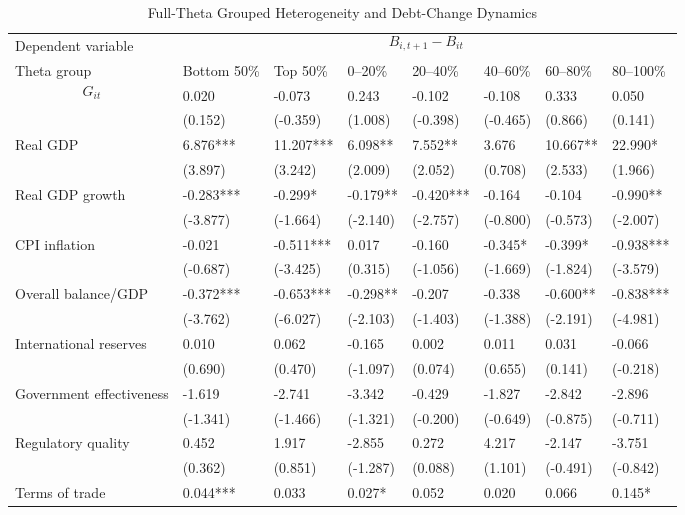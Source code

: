 \begin{table}[H]\centering
\begin{threeparttable}
\caption{Full-Theta Grouped Heterogeneity and Debt-Change Dynamics}
\label{tab:theta_group_heterogeneity_debt}
\scriptsize
\begin{tabularx}{\textwidth}{lYYYYYYY}
\toprule
Dependent variable &  \\
\cmidrule(lr){2-8}
Theta group & Bottom 50\% & Top 50\% & 0--20\% & 20--40\% & 40--60\% & 60--80\% & 80--100\% \\
\midrule
$$G_{it}$$ & 0.020 & -0.073 & 0.243 & -0.102 & -0.108 & 0.333 & 0.050 \\
  & (0.152) & (-0.359) & (1.008) & (-0.398) & (-0.465) & (0.866) & (0.141) \\
Real GDP & 6.876*** & 11.207*** & 6.098** & 7.552** & 3.676 & 10.667** & 22.990* \\
  & (3.897) & (3.242) & (2.009) & (2.052) & (0.708) & (2.533) & (1.966) \\
Real GDP growth & -0.283*** & -0.299* & -0.179** & -0.420*** & -0.164 & -0.104 & -0.990** \\
  & (-3.877) & (-1.664) & (-2.140) & (-2.757) & (-0.800) & (-0.573) & (-2.007) \\
CPI inflation & -0.021 & -0.511*** & 0.017 & -0.160 & -0.345* & -0.399* & -0.938*** \\
  & (-0.687) & (-3.425) & (0.315) & (-1.056) & (-1.669) & (-1.824) & (-3.579) \\
Overall balance/GDP & -0.372*** & -0.653*** & -0.298** & -0.207 & -0.338 & -0.600** & -0.838*** \\
  & (-3.762) & (-6.027) & (-2.103) & (-1.403) & (-1.388) & (-2.191) & (-4.981) \\
International reserves & 0.010 & 0.062 & -0.165 & 0.002 & 0.011 & 0.031 & -0.066 \\
  & (0.690) & (0.470) & (-1.097) & (0.074) & (0.655) & (0.141) & (-0.218) \\
Government effectiveness & -1.619 & -2.741 & -3.342 & -0.429 & -1.827 & -2.842 & -2.896 \\
  & (-1.341) & (-1.466) & (-1.321) & (-0.200) & (-0.649) & (-0.875) & (-0.711) \\
Regulatory quality & 0.452 & 1.917 & -2.855 & 0.272 & 4.217 & -2.147 & -3.751 \\
  & (0.362) & (0.851) & (-1.287) & (0.088) & (1.101) & (-0.491) & (-0.842) \\
Terms of trade & 0.044*** & 0.033 & 0.027* & 0.052 & 0.020 & 0.066 & 0.145* \\

\end{tabularx}
\end{threeparttable}
\end{table}
